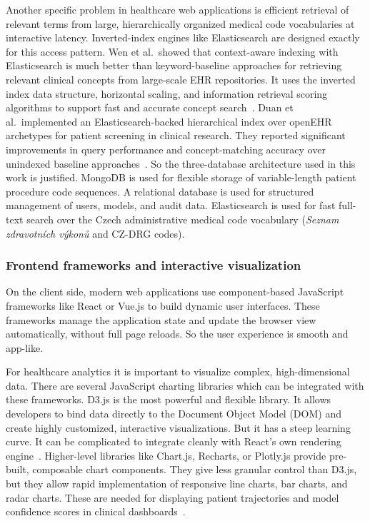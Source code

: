Another specific problem in healthcare web applications is efficient retrieval of relevant terms from large, hierarchically organized medical code vocabularies at interactive latency. Inverted-index engines like Elasticsearch are designed exactly for this access pattern. Wen et al.\ showed that context-aware indexing with Elasticsearch is much better than keyword-baseline approaches for retrieving relevant clinical concepts from large-scale EHR repositories. It uses the inverted index data structure, horizontal scaling, and information retrieval scoring algorithms to support fast and accurate concept search~\cite{wen2019elasticsearch}. Duan et al.\ implemented an Elasticsearch-backed hierarchical index over openEHR archetypes for patient screening in clinical research. They reported significant improvements in query performance and concept-matching accuracy over unindexed baseline approaches~\cite{duan2021openehr}. So the three-database architecture used in this work is justified. MongoDB is used for flexible storage of variable-length patient procedure code sequences. A relational database is used for structured management of users, models, and audit data. Elasticsearch is used for fast full-text search over the Czech administrative medical code vocabulary (\textit{Seznam zdravotních výkonů} and CZ-DRG codes).

\subsubsection{Frontend frameworks and interactive visualization}
On the client side, modern web applications use component-based JavaScript frameworks like React or Vue.js to build dynamic user interfaces. These frameworks manage the application state and update the browser view automatically, without full page reloads. So the user experience is smooth and app-like.

For healthcare analytics it is important to visualize complex, high-dimensional data. There are several JavaScript charting libraries which can be integrated with these frameworks. D3.js is the most powerful and flexible library. It allows developers to bind data directly to the Document Object Model (DOM) and create highly customized, interactive visualizations. But it has a steep learning curve. It can be complicated to integrate cleanly with React's own rendering engine~\cite{luzmo_react_charts_2025}. Higher-level libraries like Chart.js, Recharts, or Plotly.js provide pre-built, composable chart components. They give less granular control than D3.js, but they allow rapid implementation of responsive line charts, bar charts, and radar charts. These are needed for displaying patient trajectories and model confidence scores in clinical dashboards~\cite{luzmo_react_charts_2025}.

